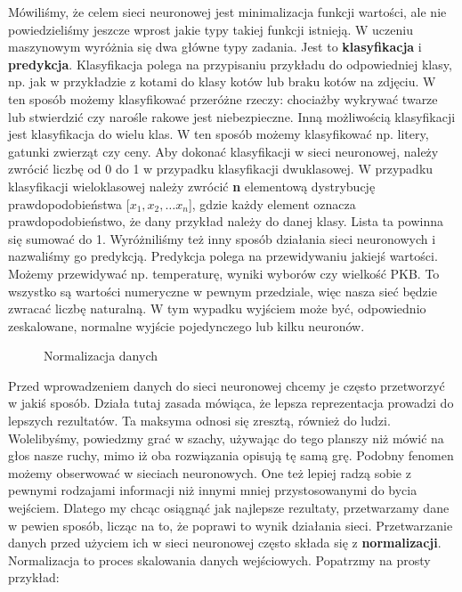 Mówiliśmy, że celem sieci neuronowej jest minimalizacja funkcji wartości, ale nie powiedzieliśmy jeszcze wprost jakie typy takiej funkcji istnieją. W uczeniu maszynowym wyróżnia się dwa główne typy zadania. Jest to \textbf{klasyfikacja} i \textbf{predykcja}. Klasyfikacja polega na przypisaniu przykładu do odpowiedniej klasy, np. jak w przykładzie z kotami do klasy kotów lub braku kotów na zdjęciu. W ten sposób możemy klasyfikować przeróżne rzeczy: chociażby wykrywać twarze lub stwierdzić czy narośle rakowe jest niebezpieczne. Inną możliwością klasyfikacji jest klasyfikacja do wielu klas. W ten sposób możemy klasyfikować np. litery, gatunki zwierząt czy ceny. Aby dokonać klasyfikacji w sieci neuronowej, należy zwrócić liczbę od 0 do 1 w przypadku klasyfikacji dwuklasowej. W przypadku klasyfikacji wieloklasowej należy zwrócić \textbf{n} elementową dystrybucję prawdopodobieństwa [$x_1, x_2, … x_n$], gdzie każdy element oznacza prawdopodobieństwo, że dany przykład należy do danej klasy. Lista ta powinna się sumować do 1. Wyróżniliśmy też inny sposób działania sieci neuronowych i nazwaliśmy go predykcją. Predykcja polega na przewidywaniu jakiejś wartości. Możemy przewidywać np. temperaturę, wyniki wyborów czy wielkość PKB. To wszystko są wartości numeryczne w pewnym przedziale, więc nasza sieć będzie zwracać liczbę naturalną. W tym wypadku wyjściem może być, odpowiednio zeskalowane, normalne wyjście pojedynczego lub kilku neuronów.\newline

\clearpage
\begin{figure}[H]
\centering

\caption{Normalizacja danych}
\end{figure}
\clearpage

Przed wprowadzeniem danych do sieci neuronowej chcemy je często przetworzyć w jakiś sposób. Działa tutaj zasada mówiąca, że lepsza reprezentacja prowadzi do lepszych rezultatów. Ta maksyma odnosi się zresztą, również do ludzi. Wolelibyśmy, powiedzmy grać w szachy, używając do tego planszy niż mówić na głos nasze ruchy, mimo iż oba rozwiązania opisują tę samą grę. Podobny fenomen możemy obserwować w sieciach neuronowych. One też lepiej radzą sobie z pewnymi rodzajami informacji niż innymi mniej przystosowanymi do bycia wejściem. Dlatego my chcąc osiągnąć jak najlepsze rezultaty, przetwarzamy dane w pewien sposób, licząc na to, że poprawi to wynik działania sieci. Przetwarzanie danych przed użyciem ich w sieci neuronowej często składa się z \textbf{normalizacji}. Normalizacja to proces skalowania danych wejściowych.
Popatrzmy na prosty przykład:\newline

